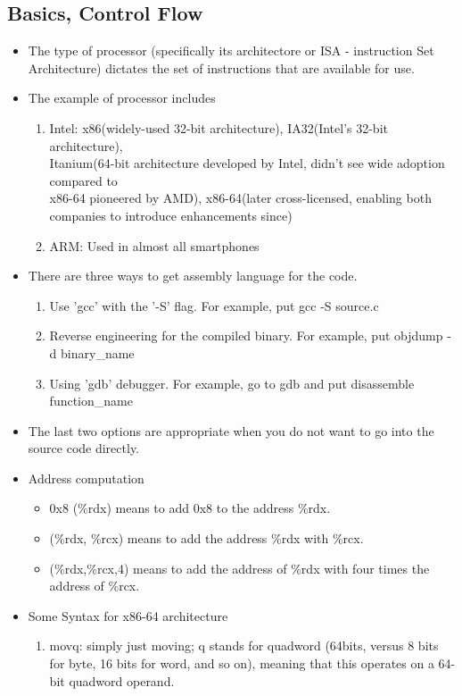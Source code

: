 \documentclass[11pt,reqno]{amsart}
\theoremstyle{remark}
\begin{document}
\subsection*{Basics, Control Flow}
\begin{itemize}
\item The type of processor (specifically its architectore or ISA - instruction Set Architecture) dictates the set
 of instructions that are available for use.
\item The example of processor includes
\begin{enumerate}
\item Intel: x86(widely-used 32-bit architecture), IA32(Intel's 32-bit architecture), \\
Itanium(64-bit architecture developed by Intel, didn't see wide adoption compared to\\
 x86-64 pioneered by AMD), x86-64(later cross-licensed, enabling both companies to introduce enhancements since)
\item ARM: Used in almost all smartphones
\end{enumerate}
\item There are three ways to get assembly language for the code.
\begin{enumerate}
\item Use 'gcc' with the '-S' flag. For example, put gcc -S source.c
\item Reverse engineering for the compiled binary. For example, put objdump -d binary\_name
\item Using 'gdb' debugger. For example, go to gdb and put disassemble function\_name
\end{enumerate}
\item The last two options are appropriate when you do not want to go into the source code directly.
\item Address computation
\begin{itemize}
\item 0x8 (\%rdx) means to add 0x8 to the address \%rdx.
\item (\%rdx, \%rcx) means to add the address \%rdx with \%rcx.
\item (\%rdx,\%rcx,4) means to add the address of \%rdx with four times the address of \%rcx.
\end{itemize}
\item Some Syntax for x86-64 architecture
\begin{enumerate}
\item movq: simply just moving; q stands for quadword (64bits, versus 8 bits for byte, 16 bits for word, and so on), meaning that this operates on a 64-bit quadword operand.

\end{enumerate}
\end{itemize}
\end{document}
